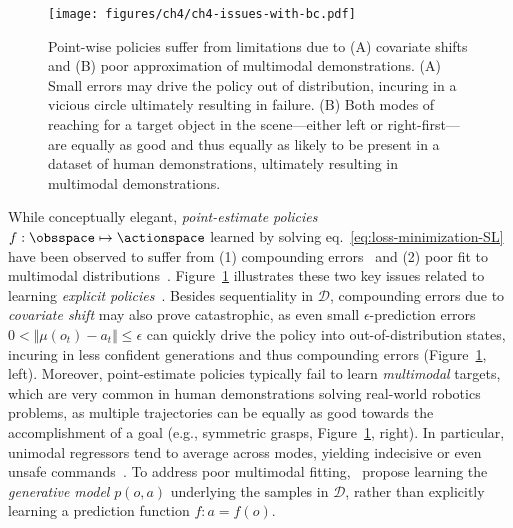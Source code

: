 \begin{figure}
    \centering
    \texttt{[image: figures/ch4/ch4-issues-with-bc.pdf]}
    \caption{Point-wise policies suffer from limitations due to (A) covariate shifts and (B) poor approximation of multimodal demonstrations. (A) Small errors may drive the policy out of distribution, incuring in a vicious circle ultimately resulting in failure. (B) Both modes of reaching for a target object in the scene---either left or right-first---are equally as good and thus equally as likely to be present in a dataset of human demonstrations, ultimately resulting in multimodal demonstrations.}
    \label{fig:ch4-issues-with-bc}
\end{figure}

While conceptually elegant, \emph{point-estimate policies} \( f : \obsspace \mapsto \actionspace \) learned by solving eq.~\ref{eq:loss-minimization-SL} have been observed to suffer from (1) compounding errors~\citep{rossReductionImitationLearning2011} and (2) poor fit to multimodal distributions~\citep{florenceImplicitBehavioralCloning2022, keGraspingChopsticksCombating2020}.
Figure~\ref{fig:ch4-issues-with-bc} illustrates these two key issues related to learning \emph{explicit policies}~\citep{florenceImplicitBehavioralCloning2022}.
Besides sequentiality in \( \mathcal D \), compounding errors due to \emph{covariate shift} may also prove catastrophic, as even small \( \epsilon \)-prediction errors \( 0 < \Vert \mu(o_t) - a_t \Vert \leq \epsilon \) can quickly drive the policy into out-of-distribution states, incuring in less confident generations and thus compounding errors (Figure~\ref{fig:ch4-issues-with-bc}, left).
Moreover, point-estimate policies typically fail to learn \emph{multimodal} targets, which are very common in human demonstrations solving real-world robotics problems, as multiple trajectories can be equally as good towards the accomplishment of a goal (e.g., symmetric grasps, Figure~\ref{fig:ch4-issues-with-bc}, right).
In particular, unimodal regressors tend to average across modes, yielding indecisive or even unsafe commands~\citep{florenceImplicitBehavioralCloning2022}.
To address poor multimodal fitting,~\citet{florenceImplicitBehavioralCloning2022} propose learning the \emph{generative model} \( p(o, a) \) underlying the samples in \( \mathcal D \), rather than explicitly learning a prediction function \( f: a = f(o) \).

